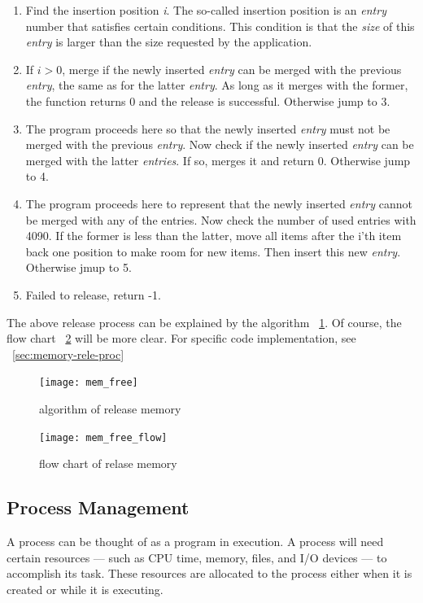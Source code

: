 \documentclass{swfcthesis}
\begin{document}
\begin{enumerate}
\item Find the insertion position \emph{i}. The so-called insertion position is an \emph{entry}
  number that satisfies certain conditions. This condition is that the \emph{size} of this
  \emph{entry} is larger than the size requested by the application.
\item If $i > 0$, merge if the newly inserted \emph{entry} can be merged with the previous \emph{entry},
  the same as for the latter \emph{entry}. As long as it merges with the former, the
  function returns 0 and the release is successful. Otherwise jump to 3.
\item The program proceeds here so that the newly inserted \emph{entry} must not be
  merged with the previous \emph{entry}. Now check if the newly inserted \emph{entry}
  can be merged with the latter \emph{entries}. If so, merges it and return 0. Otherwise
  jump to 4.
\item The program proceeds here to represent that the newly inserted \emph{entry} cannot be
  merged with any of the entries. Now check the number of used entries with 4090. If the
  former is less than the latter, move all items after the i'th item back one position to
  make room for new items. Then insert this new \emph{entry}. Otherwise jmup to 5.

\item Failed to release, return -1.
\end{enumerate}
The above release process can be explained by the algorithm ~\ref{fig:mem-relase-algo}. Of
course, the flow chart ~\ref{fig:mem-relase-flow} will be more clear. For specific code
implementation, see ~\ref{sec:memory-rele-proc}


\begin{figure}[!ht]
  \centering
  \texttt{[image: mem\_free]}
  \caption{algorithm of release memory}
  \label{fig:mem-relase-algo}
\end{figure}

\begin{figure}[!ht]
  \centering
  \texttt{[image: mem\_free\_flow]}
  \caption{flow chart of relase memory}
  \label{fig:mem-relase-flow}
\end{figure}

\subsection{Process Management}
\label{sec:process-management}
A process can be thought of as a program in execution. A process will
need certain resources — such as CPU time, memory, files, and I/O devices
— to accomplish its task. These resources are allocated to the process
either when it is created or while it is executing\cite{silberschatz2014operating}.
\end{document}
